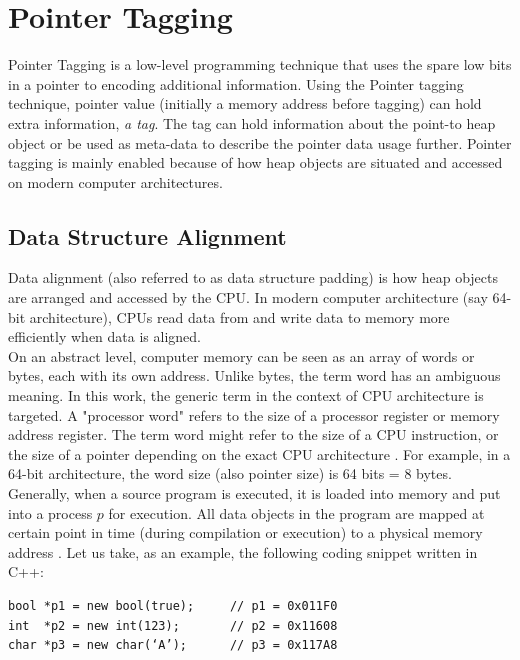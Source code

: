 \section{Pointer Tagging}
\label{sec:preliminaries:pointertagging}

Pointer Tagging \cite{taggedpointer} is a low-level programming technique that uses the spare low bits in a pointer to encoding additional information. Using the Pointer tagging technique, pointer value (initially a memory address before tagging) can hold extra information, \textit{a tag}. The tag can hold information about the point-to heap object or be used as meta-data to describe the pointer data usage further. Pointer tagging is mainly enabled because of how heap objects are situated and accessed on modern computer architectures.

\subsection{Data Structure Alignment}
\label{sec:preliminaries:data_alignment}
Data alignment (also referred to as data structure padding) is how heap objects are arranged and accessed by the CPU. In modern computer architecture (say 64-bit architecture), CPUs read data from and write data to memory more efficiently when data is aligned.  \\

On an abstract level, computer memory can be seen as an array of words or bytes, each with its own address. Unlike bytes, the term word has an ambiguous meaning. In this work, the generic term in the context of CPU architecture is targeted. A "processor word" refers to the size of a processor register or memory address register. The term word might refer to the size of a CPU instruction, or the size of a pointer depending on the exact CPU architecture \cite{OSConcept}. For example, in a 64-bit architecture, the word size (also pointer size) is 64 bits = 8 bytes.\\

Generally, when a source program is executed, it is loaded into memory and put into a process $p$ for execution. All data objects in the program are mapped at certain point in time (during compilation or execution) to a physical memory address \cite{OSConcept}. Let us take, as an example, the following coding snippet written in C++:

\begin{verbatim}
bool *p1 = new bool(true);     // p1 = 0x011F0
int  *p2 = new int(123);       // p2 = 0x11608
char *p3 = new char(‘A’);      // p3 = 0x117A8
\end{verbatim}

